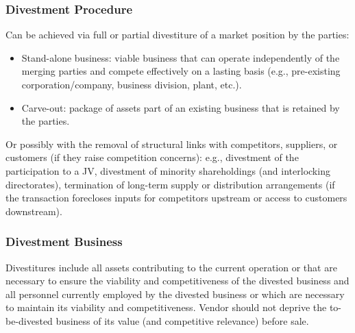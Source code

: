 \newpage
        \subsubsection{Divestment Procedure}

            Can be achieved via full or partial divestiture of a market position by the parties:
            \begin{itemize}
                \item Stand-alone business: viable business that can operate independently of the merging parties and compete effectively on a lasting basis (e.g., pre-existing corporation/company, business division, plant, etc.).
                \item Carve-out: package of assets part of an existing business that is retained by the parties.
            \end{itemize}

            
            Or possibly with the removal of structural links with competitors, suppliers, or customers (if they raise competition concerns): e.g., divestment of the participation to a JV, divestment of minority shareholdings (and interlocking directorates), termination of long-term supply or distribution arrangements (if the transaction forecloses inputs for competitors upstream or access to customers downstream).

        \subsubsection{Divestment Business}

            Divestitures include all assets contributing to the current operation or that are necessary to ensure the viability and competitiveness of the divested business and all personnel currently employed by the divested business or which are necessary to maintain its viability and competitiveness. Vendor should not deprive the to-be-divested business of its value (and competitive relevance) before sale.

